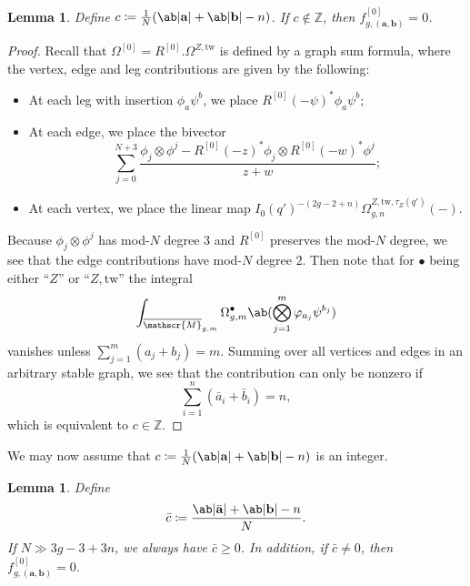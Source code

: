 \documentclass[10pt]{amsart}
\newtheorem{lem}[thm]{Lemma}
\theoremstyle{definition}
\theoremstyle{remark}
\theoremstyle{plain}
\theoremstyle{definition}
\theoremstyle{remark}
\newcommand{\Z}{\mathbb{Z}}
\newcommand{\ba}{\mathbf{a}}
\newcommand{\bb}{\mathbf{b}}
\newcommand{\msc}[1]{\mathscr{#1}}
\newcommand{\mr}[1]{\mathrm{#1}}
\newcommand{\ol}[1]{\overline{#1}}
\newcommand{\1}{\mathbf{1}}
\newcommand{\2}{\mathbf{2}}
\newcommand{\3}{\mathbf{3}}
\newcommand{\tw}{\mr{tw}}
\numberwithin{equation}{section}
\begin{document}
\begin{lem}
    Define $c \coloneqq \frac{1}{N}(\ab|\ba| + \ab|\bb| - n)$. If $c \notin \Z$, then $f_{g,(\ba,\bb)}^{[0]} = 0$.
\end{lem}

\begin{proof}
    Recall that $\Omega^{[0]} = R^{[0]}.\Omega^{Z,\tw}$ is defined by a graph sum formula, where the vertex, edge and leg contributions are given by the following:
    \begin{itemize}
        \item At each leg with insertion $\phi_a \psi^b$, we place $R^{[0]}(-\psi)^* \phi_a \psi^b$;
        \item At each edge, we place the bivector
            \[ \sum_{j=0}^{N+3} \frac{\phi_j \otimes \phi^j - R^{[0]}(-z)^* \phi_j \otimes R^{[0]}(-w)^* \phi^j}{z+w}; \]
        \item At each vertex, we place the linear map $I_0(q')^{-(2g-2+n)} \Omega_{g,n}^{Z,\tw,\tau_Z(q')}(-)$.
    \end{itemize}
    Because $\phi_j \otimes \phi^j$ has mod-$N$ degree $3$ and $R^{[0]}$ preserves the mod-$N$ degree, we see that the edge contributions have mod-$N$ degree $2$. Then note that for $\bullet$ being either ``$Z$'' or ``$Z,\tw$'' the integral
    \[ \int_{\ol{\msc{M}}_{g,m}} \Omega_{g,m}^{\bullet}\ab(\bigotimes_{j=1}^m \varphi_{a_j} \psi^{b_j}) \]
    vanishes unless $\sum_{j=1}^m (a_j+b_j) = m$. Summing over all vertices and edges in an arbitrary stable graph, we see that the contribution can only be nonzero if
    \[ \sum_{i=1}^n (\bar{a}_i + \bar{b}_i) = n, \]
    which is equivalent to $c \in \Z$.
\end{proof}

We may now assume that $c \coloneqq \frac{1}{N}(\ab|\ba| + \ab|\bb| - n)$ is an integer.

\begin{lem}\label{lem:vanishing0nospecial}
    Define
    \[ \bar{c} \coloneqq \frac{\ab|\bar{\ba}| + \ab|\bb| - n}{N}. \]
    If $N \gg 3g-3+3n$, we always have $\bar{c} \geq 0$. In addition, if $\bar{c} \neq 0$, then $f_{g,(\ba,\bb)}^{[0]} = 0$.
\end{lem}
\end{document}
